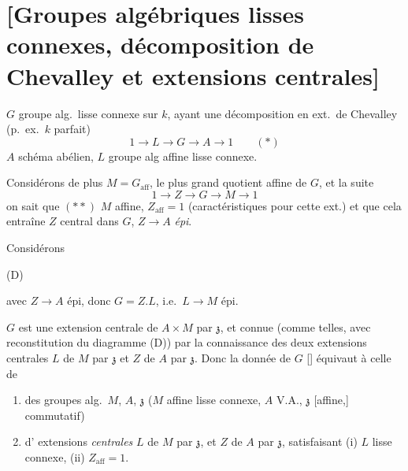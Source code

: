 \documentclass[11pt,a4paper]{article}
\begin{document}
\section{[Groupes algébriques lisses connexes, décomposition de Chevalley et extensions centrales]}

$G$ groupe alg.\ lisse connexe sur $k$, ayant une décomposition en ext.\ de Chevalley (p.\ ex.\ $k$ parfait)
\[
  1 \to L \to G \to A \to 1 \qquad (*)
\]
$A$ schéma abélien, $L$ groupe alg affine lisse connexe.

Considérons de plus $M = G_{\mathrm{aff}}$, le plus grand quotient affine de $G$, et la suite
\[
  1 \to Z \to G \to M \to 1
\]
on sait que $(**)$ $M$ affine, $Z_{\mathrm{aff}} = 1$ (caractéristiques pour cette ext.) et que cela entraîne $Z$ central dans $G$, $Z \to A$ \emph{épi}.

Considérons


(D)

avec $Z \to A$ épi, donc $G = Z.L$, i.e.\ $L \to M$ épi.

$G$ est une extension centrale de $A \times M$ par $\mathfrak{z}$, et  connue (comme telles, avec reconstitution du diagramme (D)) par la connaissance des deux extensions centrales $L$ de $M$ par $\mathfrak{z}$ et $Z$ de $A$ par $\mathfrak{z}$. Donc la donnée de $G$  [] équivaut à celle de
\begin{enumerate}
  \item[a)] des groupes alg.\ $M$, $A$, $\mathfrak{z}$ ($M$ affine lisse connexe, $A$ V.A., $\mathfrak{z}$ [affine,] commutatif)
  \item[b)] d' extensions \emph{centrales} $L$ de $M$ par $\mathfrak{z}$, et $Z$ de $A$ par $\mathfrak{z}$, satisfaisant (i) $L$ lisse connexe, (ii) $Z_{\mathrm{aff}} = 1$.
\end{enumerate}
\end{document}
